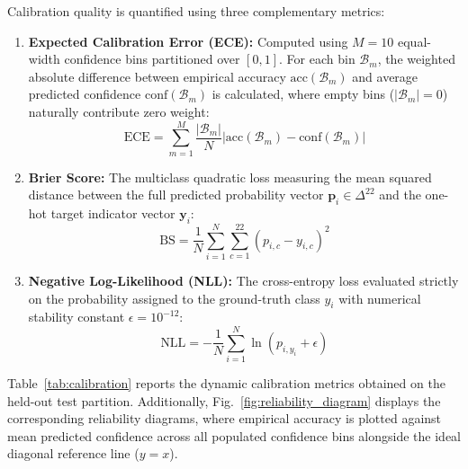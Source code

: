 \documentclass[journal]{IEEEtran}
\begin{document}
Calibration quality is quantified using three complementary metrics:
\begin{enumerate}
    \item \textbf{Expected Calibration Error (ECE):} Computed using $M=10$ equal-width confidence bins partitioned over $[0, 1]$. For each bin $\mathcal{B}_m$, the weighted absolute difference between empirical accuracy $\text{acc}(\mathcal{B}_m)$ and average predicted confidence $\text{conf}(\mathcal{B}_m)$ is calculated, where empty bins ($|\mathcal{B}_m|=0$) naturally contribute zero weight:
    \begin{equation}
    \text{ECE} = \sum_{m=1}^{M} \frac{|\mathcal{B}_m|}{N} \left| \text{acc}(\mathcal{B}_m) - \text{conf}(\mathcal{B}_m) \right|
    \end{equation}
    \item \textbf{Brier Score:} The multiclass quadratic loss measuring the mean squared distance between the full predicted probability vector $\mathbf{p}_i \in \Delta^{22}$ and the one-hot target indicator vector $\mathbf{y}_i$:
    \begin{equation}
    \text{BS} = \frac{1}{N} \sum_{i=1}^{N} \sum_{c=1}^{22} \left( p_{i,c} - y_{i,c} \right)^2
    \end{equation}
    \item \textbf{Negative Log-Likelihood (NLL):} The cross-entropy loss evaluated strictly on the probability assigned to the ground-truth class $y_i$ with numerical stability constant $\epsilon = 10^{-12}$:
    \begin{equation}
    \text{NLL} = -\frac{1}{N} \sum_{i=1}^{N} \ln\left( p_{i, y_i} + \epsilon \right)
    \end{equation}
\end{enumerate}

Table~\ref{tab:calibration} reports the dynamic calibration metrics obtained on the held-out test partition. Additionally, Fig.~\ref{fig:reliability_diagram} displays the corresponding reliability diagrams, where empirical accuracy is plotted against mean predicted confidence across all populated confidence bins alongside the ideal diagonal reference line ($y=x$).
\end{document}
